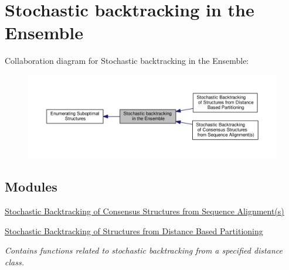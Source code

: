 \hypertarget{group__subopt__stochbt}{\section{Stochastic backtracking in the Ensemble}
\label{group__subopt__stochbt}
}
Collaboration diagram for Stochastic backtracking in the Ensemble\-:
\nopagebreak
\begin{figure}[H]
\begin{center}
\leavevmode
\includegraphics[width=350pt]{group__subopt__stochbt}
\end{center}
\end{figure}
\subsection*{Modules}
\begin{DoxyCompactItemize}
\item 
\hyperlink{group__consensus__stochbt}{Stochastic Backtracking of Consensus Structures from Sequence Alignment(s)}
\item 
\hyperlink{group__kl__neighborhood__stochbt}{Stochastic Backtracking of Structures from Distance Based Partitioning}
\begin{DoxyCompactList}\small\item\em Contains functions related to stochastic backtracking from a specified distance class. \end{DoxyCompactList}\end{DoxyCompactItemize}
